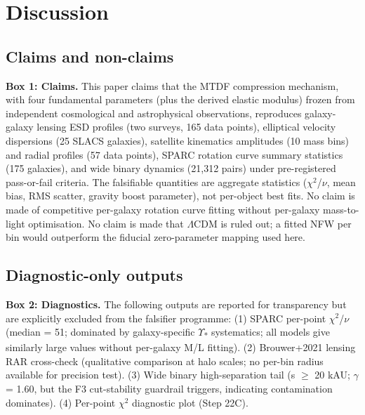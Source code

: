 \documentclass[11pt,a4paper]{article}
\begin{document}
\section{Discussion}
\label{sec:discussion}

\subsection{Claims and non-claims}
\begin{mdframed}[linecolor=accent,linewidth=0.5pt,backgroundcolor=callout-bg,leftline=true,rightline=true,topline=true,bottomline=true,innerleftmargin=8pt,innerrightmargin=8pt,innertopmargin=6pt,innerbottommargin=6pt]
\textbf{Box 1: Claims.} This paper claims that the MTDF compression mechanism, with four fundamental parameters (plus the derived elastic modulus) frozen from independent cosmological and astrophysical observations, reproduces galaxy-galaxy lensing ESD profiles (two surveys, 165 data points), elliptical velocity dispersions (25 SLACS galaxies), satellite kinematics amplitudes (10 mass bins) and radial profiles (57 data points), SPARC rotation curve summary statistics (175 galaxies), and wide binary dynamics (21,312 pairs) under pre-registered pass-or-fail criteria. The falsifiable quantities are aggregate statistics ($\chi$$^{2}$/$\nu$, mean bias, RMS scatter, gravity boost parameter), not per-object best fits. No claim is made of competitive per-galaxy rotation curve fitting without per-galaxy mass-to-light optimisation. No claim is made that $\Lambda$CDM is ruled out; a fitted NFW per bin would outperform the fiducial zero-parameter mapping used here.
\end{mdframed}

\subsection{Diagnostic-only outputs}
\begin{mdframed}[linecolor=accent,linewidth=0.5pt,backgroundcolor=callout-bg,leftline=true,rightline=true,topline=true,bottomline=true,innerleftmargin=8pt,innerrightmargin=8pt,innertopmargin=6pt,innerbottommargin=6pt]
\textbf{Box 2: Diagnostics.} The following outputs are reported for transparency but are explicitly excluded from the falsifier programme: (1) SPARC per-point $\chi$$^{2}$/$\nu$ (median = 51; dominated by galaxy-specific $\Upsilon$\textsubscript{*} systematics; all models give similarly large values without per-galaxy M/\allowbreak{}L fitting). (2) Brouwer+2021 lensing RAR cross-check (qualitative comparison at halo scales; no per-bin radius available for precision test). (3) Wide binary high-separation tail (s $\ge$ 20 kAU; $\gamma$ = 1.60, but the F3 cut-stability guardrail triggers, indicating contamination dominates). (4) Per-point $\chi$$^{2}$ diagnostic plot (Step 22C).
\end{mdframed}
\end{document}
